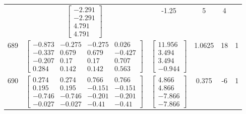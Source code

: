 \documentclass[a4paper,12pt]{article}
\begin{document}
\begin{tabular}{c c c c c c}
&
$\begin{bmatrix} -2.291 \\ -2.291 \\ 4.791 \\ 4.791 \end{bmatrix}$
&
-1.25
&
5
&
4
\\
689
&
$\begin{bmatrix} -0.873 & -0.275 & -0.275 & 0.026 \\ -0.337 & 0.679 & 0.679 & -0.427 \\ -0.207 & 0.17 & 0.17 & 0.707 \\ 0.284 & 0.142 & 0.142 & 0.563 \end{bmatrix}$
&
$\begin{bmatrix} 11.956 \\ 3.494 \\ 3.494 \\ -0.944 \end{bmatrix}$
&
1.0625
&
18
&
1
\\
690
&
$\begin{bmatrix} 0.274 & 0.274 & 0.766 & 0.766 \\ 0.195 & 0.195 & -0.151 & -0.151 \\ -0.746 & -0.746 & -0.201 & -0.201 \\ -0.027 & -0.027 & -0.41 & -0.41 \end{bmatrix}$
&
$\begin{bmatrix} 4.866 \\ 4.866 \\ -7.866 \\ -7.866 \end{bmatrix}$
&
0.375
&
-6
&
1
\\
\end{tabular} \egroup \newpage
\end{document}
